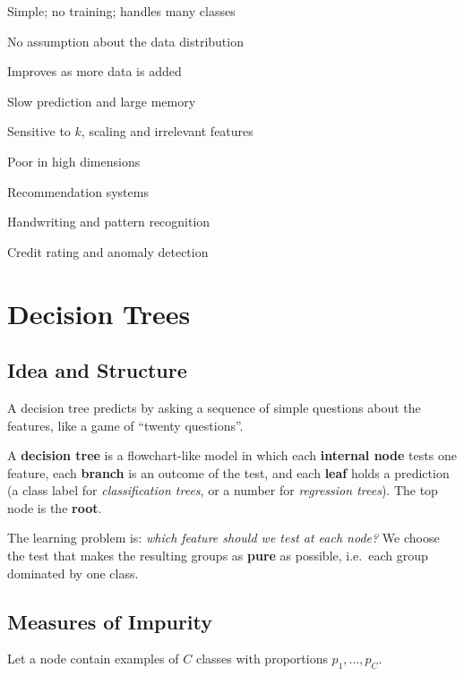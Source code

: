 {\item Simple; no training; handles many classes
 \item No assumption about the data distribution
 \item Improves as more data is added}
{\item Slow prediction and large memory
 \item Sensitive to $k$, scaling and irrelevant features
 \item Poor in high dimensions}
{\item Recommendation systems
 \item Handwriting and pattern recognition
 \item Credit rating and anomaly detection}

\section{Decision Trees}

\subsection{Idea and Structure}

A decision tree predicts by asking a sequence of simple questions about the features, like a game of ``twenty questions''.

\begin{definition}
A \textbf{decision tree} is a flowchart-like model in which each \textbf{internal node} tests one feature, each \textbf{branch} is an outcome of the test, and each \textbf{leaf} holds a prediction (a class label for \emph{classification trees}, or a number for \emph{regression trees}). The top node is the \textbf{root}.
\end{definition}

The learning problem is: \emph{which feature should we test at each node?} We choose the test that makes the resulting groups as \textbf{pure} as possible, i.e.\ each group dominated by one class.

\subsection{Measures of Impurity}

Let a node contain examples of $C$ classes with proportions $p_1,\dots,p_C$.

